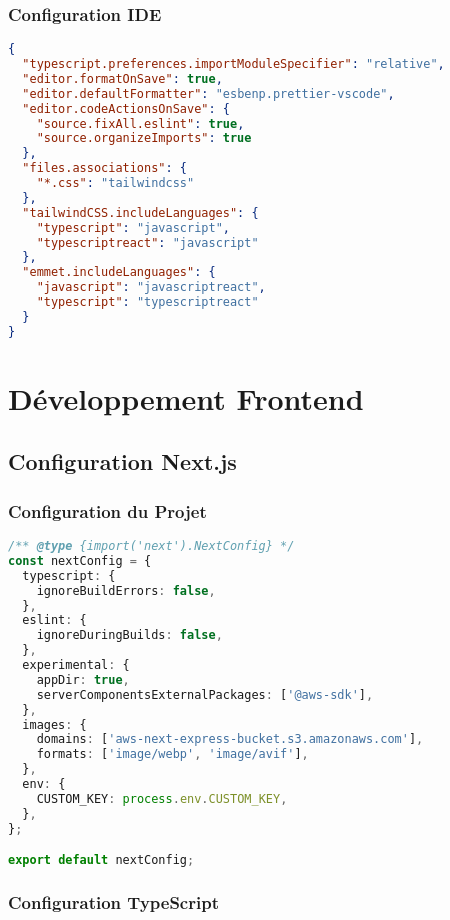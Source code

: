 \subsubsection{Configuration IDE}

\begin{lstlisting}[language=JSON, caption=Configuration VSCode (.vscode/settings.json)]
{
  "typescript.preferences.importModuleSpecifier": "relative",
  "editor.formatOnSave": true,
  "editor.defaultFormatter": "esbenp.prettier-vscode",
  "editor.codeActionsOnSave": {
    "source.fixAll.eslint": true,
    "source.organizeImports": true
  },
  "files.associations": {
    "*.css": "tailwindcss"
  },
  "tailwindCSS.includeLanguages": {
    "typescript": "javascript",
    "typescriptreact": "javascript"
  },
  "emmet.includeLanguages": {
    "javascript": "javascriptreact",
    "typescript": "typescriptreact"
  }
}
\end{lstlisting}

\section{Développement Frontend}

\subsection{Configuration Next.js}

\subsubsection{Configuration du Projet}

\begin{lstlisting}[language=TypeScript, caption=Configuration Next.js (next.config.mjs)]
/** @type {import('next').NextConfig} */
const nextConfig = {
  typescript: {
    ignoreBuildErrors: false,
  },
  eslint: {
    ignoreDuringBuilds: false,
  },
  experimental: {
    appDir: true,
    serverComponentsExternalPackages: ['@aws-sdk'],
  },
  images: {
    domains: ['aws-next-express-bucket.s3.amazonaws.com'],
    formats: ['image/webp', 'image/avif'],
  },
  env: {
    CUSTOM_KEY: process.env.CUSTOM_KEY,
  },
};

export default nextConfig;
\end{lstlisting}

\subsubsection{Configuration TypeScript}

